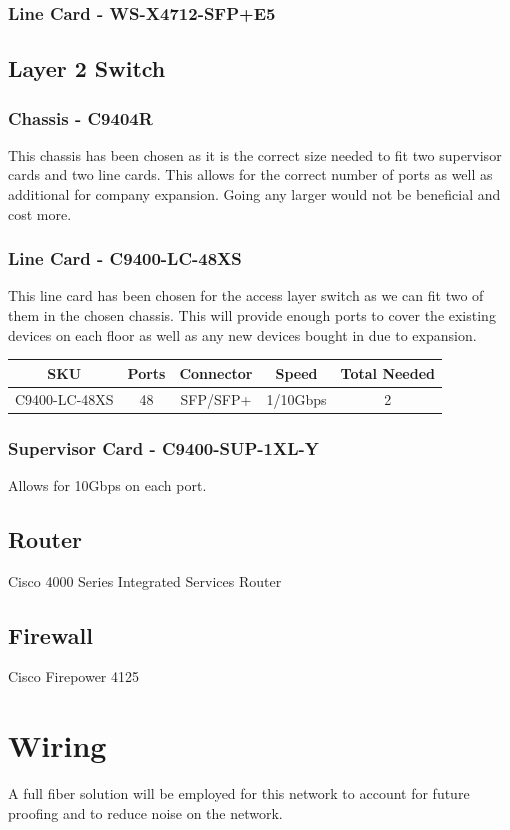 \subsubsection{Line Card - WS-X4712-SFP+E5}
\subsection{Layer 2 Switch}
\subsubsection{Chassis - C9404R}
This chassis has been chosen as it is the correct size needed to fit two supervisor cards and two line cards. This allows for the correct number of ports as well as additional for company expansion. Going any larger would not be beneficial and cost more. 
\subsubsection{Line Card - C9400-LC-48XS}
This line card has been chosen for the access layer switch as we can fit two of them in the chosen chassis. This will provide enough ports to cover the existing devices on each floor as well as any new devices bought in due to expansion.
\begin{table}[H]
    \begin{tabular}{|ccccc|}
    \hline
    \multicolumn{1}{|c|}{SKU} & \multicolumn{1}{c|}{Ports} & \multicolumn{1}{c|}{Connector} & \multicolumn{1}{c|}{Speed} & Total Needed \\ \hline
    C9400-LC-48XS             & 48                         & SFP/SFP+                       & 1/10Gbps                   & 2            \\ \hline
    \end{tabular}
\end{table}
\subsubsection{Supervisor Card - C9400-SUP-1XL-Y}
Allows for 10Gbps on each port.
\subsection{Router}
Cisco 4000 Series Integrated Services Router
\subsection{Firewall}
Cisco Firepower 4125
\section{Wiring}
A full fiber solution will be employed for this network to account for future proofing and to reduce noise on the network.
